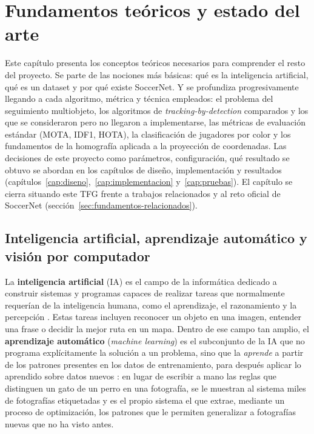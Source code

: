 \chapter{Fundamentos teóricos y estado del arte}
\label{cap:fundamentos}

Este capítulo presenta los conceptos
teóricos necesarios para comprender el resto del proyecto. Se parte de
las nociones más básicas: qué es la inteligencia artificial, qué es un
dataset y por qué existe SoccerNet. Y se profundiza progresivamente llegando a
 cada algoritmo, métrica y técnica empleados: el
problema del seguimiento multiobjeto, los algoritmos de \emph{tracking-by-detection}
comparados y los que se consideraron pero no llegaron
a implementarse, las métricas de evaluación estándar (MOTA, IDF1,
HOTA), la clasificación de jugadores por color y los
fundamentos de la homografía aplicada a la proyección de coordenadas.
Las decisiones de este proyecto como parámetros, configuración,
qué resultado se obtuvo se abordan en los capítulos de
diseño, implementación y resultados
(capítulos~\ref{cap:diseno},~\ref{cap:implementacion} y~\ref{cap:pruebas}).
El capítulo se cierra situando este TFG frente a trabajos relacionados y al
reto oficial de SoccerNet (sección~\ref{sec:fundamentos-relacionados}).

\section{Inteligencia artificial, aprendizaje automático y visión por computador}
\label{sec:fundamentos-ia}

La \textbf{inteligencia artificial} (IA) es el
campo de la informática dedicado a construir sistemas y programas capaces de realizar
tareas que normalmente requerían de la inteligencia humana, como el aprendizaje, el razonamiento y la percepción
\citep{gobiernoespana2023ia}.
Estas tareas incluyen reconocer un objeto en una imagen, entender una frase o
decidir la mejor ruta en un mapa. Dentro de ese campo tan amplio, el
\textbf{aprendizaje automático} (\emph{machine learning}) es el subconjunto
de la IA que no programa explícitamente la solución a un problema, sino que
la \emph{aprende} a partir de los patrones presentes en los datos de
entrenamiento, para después aplicar lo aprendido sobre datos nuevos
\citep{ibm2026ml}: en lugar de escribir a mano las
reglas que distinguen un gato de un perro en una fotografía, se le muestran
al sistema miles de fotografías etiquetadas y es el propio sistema el que
extrae, mediante un proceso de optimización, los patrones que le permiten
generalizar a fotografías nuevas que no ha visto antes.

